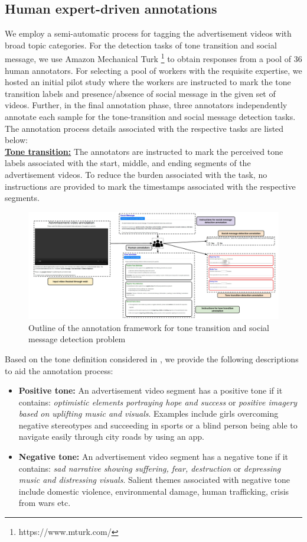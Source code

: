 \subsection{Human expert-driven annotations}
We employ a semi-automatic process for tagging the advertisement videos with broad topic categories. For the detection tasks of tone transition and social message, we use Amazon Mechanical Turk \footnote{https://www.mturk.com/} to obtain responses from a pool of 36 human annotators. 
For selecting a pool of workers with the requisite expertise, we hosted an initial pilot study where the workers are instructed to mark the tone transition labels and presence/absence of social message in the given set of videos. Further, in the final annotation phase, three annotators independently annotate each sample for the tone-transition and social message detection tasks. 
The annotation process details associated with the respective tasks are listed below:\\
\textbf{\underline{Tone transition:}} The annotators are instructed to mark the perceived tone labels associated with the start, middle, and ending segments of the advertisement videos. To reduce the burden associated with the task, no instructions are provided to mark the timestamps associated with the respective segments. 
\begin{figure}[h!]
    \centering
    \includegraphics[width=\textwidth]{figures/Annotation_Flow_Part_2_updated.pdf}
    \caption{Outline of the annotation framework for tone transition and social message detection problem}
    \label{annot_framework}
\end{figure}
Based on the tone definition considered in \cite{Brooks2020ExploringAO}, we provide the following descriptions to aid the annotation process:
\begin{itemize}
    \item \textbf{Positive tone:} An advertisement video segment has a positive tone if it contains: \textit{optimistic elements portraying hope and success} or \textit{positive imagery based on uplifting music and visuals}. Examples include girls overcoming negative stereotypes and succeeding in sports or a blind person being able to navigate easily through city roads by using an app.
    \item \textbf{Negative tone:} An advertisement video segment has a negative tone if it contains: \textit{sad narrative showing suffering, fear, destruction} or \textit{depressing music and distressing visuals}. Salient themes associated with negative tone include domestic violence, environmental damage, human trafficking, crisis from wars etc.
\end{itemize}

